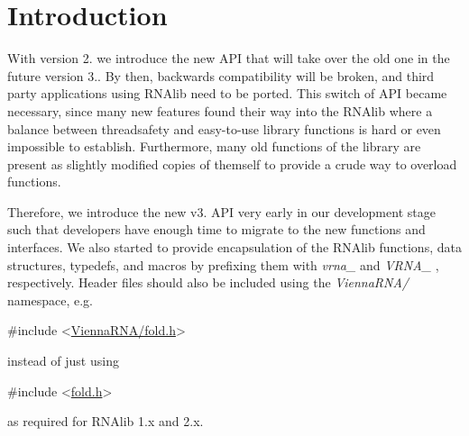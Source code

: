 \hypertarget{newAPI_newAPI_intro}{}\section{Introduction}\label{newAPI_newAPI_intro}
With version 2. we introduce the new A\+P\+I that will take over the old one in the future version 3.. By then, backwards compatibility will be broken, and third party applications using R\+N\+Alib need to be ported. This switch of A\+P\+I became necessary, since many new features found their way into the R\+N\+Alib where a balance between threadsafety and easy-\/to-\/use library functions is hard or even impossible to establish. Furthermore, many old functions of the library are present as slightly modified copies of themself to provide a crude way to overload functions.

Therefore, we introduce the new v3. A\+P\+I very early in our development stage such that developers have enough time to migrate to the new functions and interfaces. We also started to provide encapsulation of the R\+N\+Alib functions, data structures, typedefs, and macros by prefixing them with {\itshape vrna\+\_\+} and {\itshape V\+R\+N\+A\+\_\+} , respectively. Header files should also be included using the {\itshape Vienna\+R\+N\+A/} namespace, e.\+g. 
\begin{DoxyCode}
\textcolor{preprocessor}{#include <\hyperlink{fold_8h}{ViennaRNA/fold.h}>}
\end{DoxyCode}
 instead of just using 
\begin{DoxyCode}
\textcolor{preprocessor}{#include <\hyperlink{fold_8h}{fold.h}>}
\end{DoxyCode}
 as required for R\+N\+Alib 1.\+x and 2.\+x.

